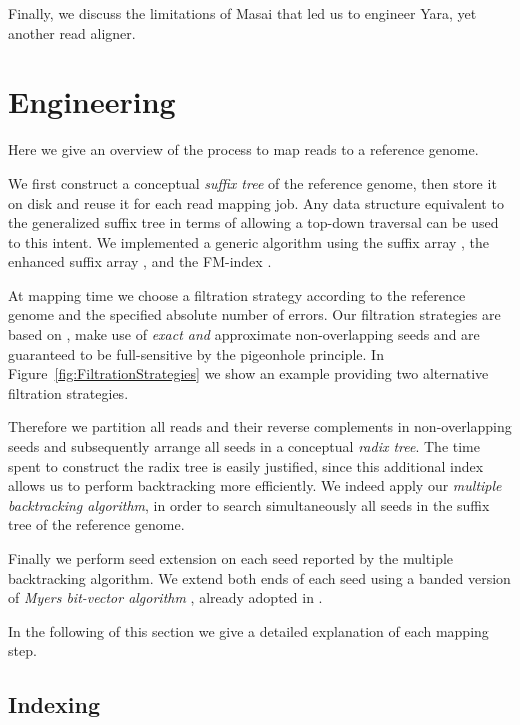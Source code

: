 Finally, we discuss the limitations of Masai that led us to engineer Yara, yet another read aligner.


\section{Engineering}

Here we give an overview of the process to map reads to a reference genome.

We first construct a conceptual \emph{suffix tree} of the reference genome, then store it on disk and reuse it for each read mapping job.
Any data structure equivalent to the generalized suffix tree in terms of allowing a top-down traversal can be used to this intent. We implemented a generic algorithm using the suffix array \citep{Manber1990}, the enhanced suffix array \citep{Abouelhoda2004}, and the FM-index \citep{Ferragina2001}.

At mapping time we choose a filtration strategy according to the reference genome and the specified absolute number of errors.
Our filtration strategies are based on \citep{Navarro2000}, make use of \emph{exact and} approximate non-overlapping seeds and are guaranteed to be full-sensitive by the pigeonhole principle.
In Figure~\ref{fig:FiltrationStrategies} we show an example providing two alternative filtration strategies.

Therefore we partition all reads and their reverse complements in non-overlapping seeds and subsequently arrange all seeds in a conceptual \emph{radix tree}.
The time spent to construct the radix tree is easily justified, since this additional index allows us to perform backtracking more efficiently.
We indeed apply our \emph{multiple backtracking algorithm}, in order to search simultaneously all seeds in the suffix tree of the reference genome.

Finally we perform seed extension on each seed reported by the multiple backtracking algorithm.
We extend both ends of each seed using a banded version of \emph{Myers bit-vector algorithm} \citep{Myers1999},  already adopted in \citep{Razers3}.

In the following of this section we give a detailed explanation of each mapping step.

\subsection{Indexing}

